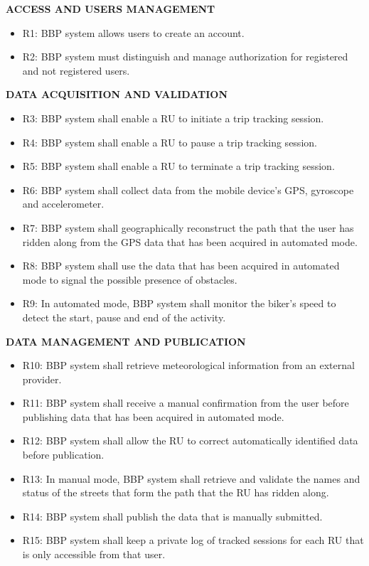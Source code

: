\documentclass{article}
\begin{document}
\textbf{ACCESS AND USERS MANAGEMENT}
\begin{itemize}
\item R1: BBP system allows users to create an account.
\item R2: BBP system must distinguish and manage authorization for registered and not registered users.
\end{itemize}

\noindent
\textbf{DATA ACQUISITION AND VALIDATION} 
\begin{itemize}
\item R3: BBP system shall enable a RU to initiate a trip tracking session.
\item R4: BBP system shall enable a RU to pause a trip tracking session.
\item R5: BBP system shall enable a RU to terminate a trip tracking session. 
\item R6: BBP system shall collect data from the mobile device’s GPS, gyroscope and accelerometer.
\item R7: BBP system shall geographically reconstruct the path that the user has ridden along from the GPS data that has been acquired in automated mode.
\item R8: BBP system shall use the data that has been acquired in automated mode to signal the possible presence of obstacles.
\item R9: In automated mode, BBP system shall monitor the biker’s speed to detect the start, pause and end of the activity.  
\end{itemize}

\noindent
\textbf{DATA MANAGEMENT AND PUBLICATION}
\begin{itemize}
\item R10: BBP system shall retrieve meteorological information from an external provider.
\item R11: BBP system shall receive a manual confirmation from the user before publishing data that has been acquired in automated mode.
\item R12: BBP system shall allow the RU to correct automatically identified data before publication.
\item R13: In manual mode, BBP system shall retrieve and validate the names and status of the streets that form the path that the RU has ridden along.
\item R14: BBP system shall publish the data that is manually submitted.
\item R15: BBP system shall keep a private log of tracked sessions for each RU that is only accessible from that user.
\end{itemize}
\end{document}
